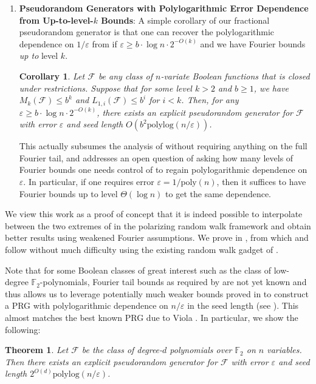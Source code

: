 \documentclass[10pt,a4paper]{article}
\newcommand{\eps}{\varepsilon}
\newtheorem{corollary}[theorem]{Corollary}
\newtheorem{THM}[theorem]{Theorem}
\theoremstyle{definition}
\begin{document}
\begin{enumerate}
\item \textbf{Pseudorandom Generators with Polylogarithmic Error Dependence from Up-to-level-$k$ Bounds}: A simple corollary of our fractional pseudorandom generator is that one can recover the polylogarithmic dependence on $1/\eps$ from \cite{CHHL} if $\eps \geq b\cdot \log n \cdot 2^{-O(k)}$ and we have Fourier bounds \emph{up to} level $k$. 
\begin{corollary}
\label{cor:polylogerr}
Let $\mathcal{F}$ be any class of $n$-variate Boolean functions that is closed under restrictions.  Suppose that for some level $k>2$ and $b\geq 1$, we have $M_k(\mathcal{F})\leq b^k$ and  $L_{1,i}(\mathcal{F})\leq b^{i}$ for $i<k$. Then, for any $\eps\geq b\cdot\log n \cdot 2^{-O(k)}$, there exists an explicit pseudorandom generator for $\mathcal{F}$ with error $\eps$ and seed length $O( b^{2} \mathrm{polylog}(n/\eps))$.
\end{corollary}
 
  This actually subsumes the analysis of \cite{CHHL} without requiring anything on the full Fourier tail, and addresses an open question of \cite{CHLT} asking how many levels of Fourier bounds one needs control of to regain polylogarithmic dependence on $\eps$. In particular, if one requires error $\eps = 1/\mathrm{poly}(n)$, then it suffices to have Fourier bounds up to level $\Theta(\log n)$ to get the same dependence.
\end{enumerate}
We view this work as a proof of concept that it is indeed possible to interpolate between the two extremes of \cite{CHHL,CHLT} in the polarizing random walk framework and obtain better results using weakened Fourier assumptions.  We prove  in , from which  and  follow without much difficulty using the existing random walk gadget of \cite{CHHL}. 

Note that for some Boolean classes of great interest such as the class of low-degree $\mathbb{F}_2$-polynomials, Fourier tail bounds as required by \cite{CHHL} are not yet known and thus  allows us to leverage potentially much weaker bounds proved in \cite{CHHL} to construct a PRG with polylogarithmic dependence on $n/\eps$ in the seed length (see ).  This almost matches the best known PRG due to Viola \cite{viola2009sum}. In particular, we show the following:

\begin{THM}\label{thm:main_poly}
Let $\mathcal{F}$ be the class of degree-$d$ polynomials over $\mathbb{F}_2$ on $n$ variables. Then there exists an explicit pseudorandom generator for $\mathcal{F}$ with error $\eps$ and seed length $2^{O(d)}\mathrm{polylog}(n/\eps)$.
\end{THM}
\end{document}
